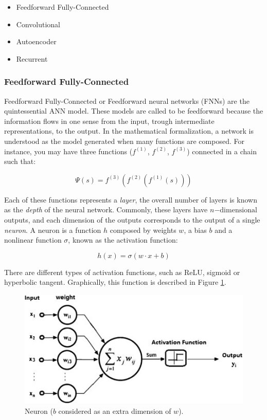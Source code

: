 \begin{itemize}
    \item Feedforward Fully-Connected
    \item Convolutional
    \item Autoencoder
    \item Recurrent
\end{itemize}

\subsubsection{Feedforward Fully-Connected}
    
Feedforward Fully-Connected or Feedforward neural networks (FNNs) are the quintessential ANN model. These models are called to be feedforward because the information flows in one sense from the input, trough intermediate representations, to the output. In the mathematical formalization, a network is understood as the model generated when many functions are composed. For instance, you may have three functions ($f^{(1)}$, $f^{(2)}$, $f^{(3)}$) connected in a chain such that:

\begin{equation}
    \Psi(s) = f^{(3)}(f^{(2)}(f^{(1)}(s)))
\end{equation}

Each of these functions represents a \emph{layer}, the overall number of layers is known as the \emph{depth} of the neural network. Commonly, these layers have $n\mathrm{-dimensional}$ outputs, and each dimension of the outputs corresponds to the output of a single \emph{neuron}. A neuron is a function $h$ composed by weights $w$, a bias $b$ and a nonlinear function $\sigma$, known as the activation function:

\begin{equation}
    h(x) = \sigma(w \cdot x + b)
    \label{eq:h}
\end{equation}

There are different types of activation functions, such as ReLU, sigmoid or hyperbolic tangent. Graphically, this function is described in Figure \ref{fig:neuron}.

\begin{figure}[H]
    \centering
    \includegraphics[width=0.6\linewidth]{imagenes/cap1/neuron.jpeg}
    \caption{Neuron ($b$ considered as an extra dimension of $w$).\protect\footnotemark}
    \label{fig:neuron}
\end{figure}

